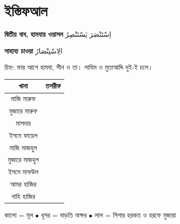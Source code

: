 \newpage

\section{ইস্তিফআল}

\begin{center}
  \textbf{দ্বিতীয় বাব, হামযায় ওয়াসল}
  \enspace
  {\arabicfont \textarabic{اِسْتَنْصَرَ يَسْتَنْصِرُ}}
\end{center}

\vspace{0.2cm}

\begin{center}
  \textbf{সাহায্য চাওয়া}
  \enspace
  {\arabicfont \textarabic{الِاسْتِنْصَارُ}}
\end{center}

\vspace{0.25cm}

\noindent চিহ্ন: ফার আগে হামযা, সীন ও তা।
লাযিম ও মুতাআদ্দি দুই-ই চলে।

\vspace{0.3cm}

\begingroup
\setlength{\arrayrulewidth}{0.5pt}
\setlength{\tabcolsep}{4pt}
\renewcommand{\arraystretch}{1.85}

\noindent\begin{tabularx}{\textwidth}{|C|C|}
  \hline
  {\color{white}\textbf{খানা}} &
  {\color{white}\textbf{তসরীফ}} \\
  \hline
  মাজি মারুফ &
  {\arabicfont {}} \\
  \hline
  মুজারে মারুফ &
  {\arabicfont {}} \\
  \hline
  মাসদার &
  {\arabicfont \textarabic{}} \\
  \hline
  ইসমে ফায়েল &
  {\arabicfont \textarabic{}} \\
  \hline
  মাজি মাজহুল &
  {\arabicfont {}} \\
  \hline
  মুজারে মাজহুল &
  {\arabicfont {}} \\
  \hline
  ইসমে মাফউল &
  {\arabicfont \textarabic{}} \\
  \hline
  আমর হাজির &
  {\arabicfont {}} \\
  \hline
  নাহি হাজির &
  {\arabicfont {}} \\
  \hline
\end{tabularx}
\endgroup

\vspace{0.25cm}

\begin{center}
  {\small
    কালো = মূল
    \enspace$\bullet$\enspace
    ধূসর = বাড়তি অক্ষর
    \enspace$\bullet$\enspace
    লাল = সিগার হরকত ও হরফে মুজারা
  }
\end{center}
